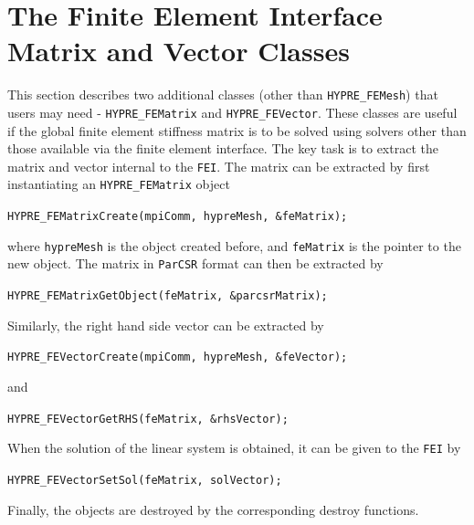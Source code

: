 \section{The Finite Element Interface Matrix and Vector Classes}

This section describes two additional classes (other than {\tt HYPRE\_FEMesh})
that users may need - {\tt HYPRE\_FEMatrix} and {\tt HYPRE\_FEVector}. 
These classes are useful if the global finite element stiffness matrix is
to be solved using solvers other than those available via the finite element
interface. The key task is to extract
the matrix and vector internal to the {\tt FEI}. The matrix can be extracted
by first instantiating an {\tt HYPRE\_FEMatrix} object
\begin{tabbing}
\hspace{0.5in} \= {\tt HYPRE\_FEMatrixCreate(mpiComm, hypreMesh, \&feMatrix);}
\end{tabbing}
where {\tt hypreMesh} is the object created before, and {\tt feMatrix} is 
the pointer to the new object.
The \hypre{} matrix in {\tt ParCSR} format can then be extracted by
\begin{tabbing}
\hspace{0.5in} \= {\tt HYPRE\_FEMatrixGetObject(feMatrix, \&parcsrMatrix);}
\end{tabbing}
Similarly, the right hand side vector can be extracted by
\begin{tabbing}
\hspace{0.5in} \= {\tt HYPRE\_FEVectorCreate(mpiComm, hypreMesh, \&feVector);}
\end{tabbing}
and
\begin{tabbing}
\hspace{0.5in} \= {\tt HYPRE\_FEVectorGetRHS(feMatrix, \&rhsVector);}
\end{tabbing}
When the solution of the linear system is obtained, it can be given
to the {\tt FEI} by
\begin{tabbing}
\hspace{0.5in} \= {\tt HYPRE\_FEVectorSetSol(feMatrix, solVector);}
\end{tabbing}
Finally, the objects are destroyed by the corresponding destroy functions.



